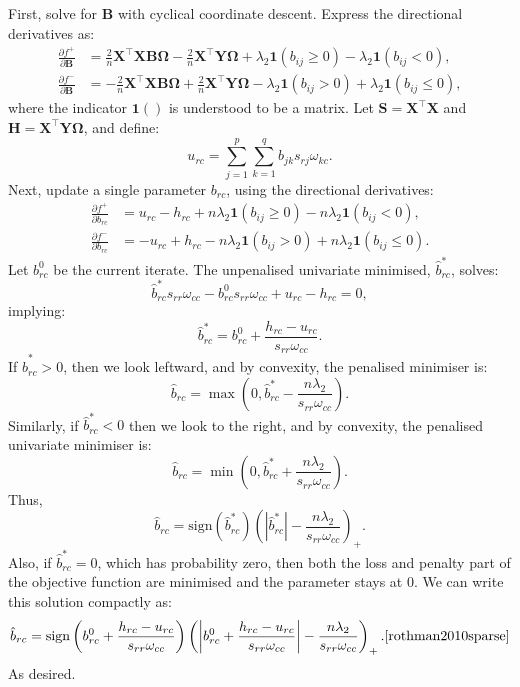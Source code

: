\documentclass[11pt]{report} %
\begin{document}
\noindent First, solve for $\mathbf{B}$ with cyclical coordinate descent. Express the directional derivatives as:
\begin{align*}
\frac{\partial f^+}{\partial \mathbf{B}} &= \frac{2}{n} \mathbf{X}^\top \mathbf{X} \mathbf{B} \mathbf{\Omega} - \frac{2}{n} \mathbf{X}^\top \mathbf{Y} \mathbf{\Omega} + \lambda_2 \mathbf{1}(b_{ij} \geq 0) - \lambda_2 \mathbf{1}(b_{ij} < 0), \\
\frac{\partial f^-}{\partial \mathbf{B}} &= -\frac{2}{n} \mathbf{X}^\top \mathbf{X} \mathbf{B} \mathbf{\Omega} + \frac{2}{n} \mathbf{X}^\top \mathbf{Y} \mathbf{\Omega} - \lambda_2 \mathbf{1}(b_{ij} > 0) + \lambda_2 \mathbf{1}(b_{ij} \leq 0),
\end{align*}
where the indicator $\mathbf{1}()$ is understood to be a matrix. Let $\mathbf{S} = \mathbf{X}^\top \mathbf{X}$ and $\mathbf{H} = \mathbf{X}^\top \mathbf{Y} \mathbf{\Omega}$, and define:
\[
u_{rc} = \sum_{j=1}^{p} \sum_{k=1}^{q} b_{jk} s_{rj} \omega_{kc}.
\]
Next, update a single parameter $b_{rc}$, using the directional derivatives:
\begin{align*}
\frac{\partial f^+}{\partial b_{rc}} &= u_{rc} - h_{rc} + n \lambda_2 \mathbf{1}(b_{ij} \geq 0) - n \lambda_2 \mathbf{1}(b_{ij} < 0), \\
\frac{\partial f^-}{\partial b_{rc}} &= -u_{rc} + h_{rc} - n \lambda_2 \mathbf{1}(b_{ij} > 0) + n \lambda_2 \mathbf{1}(b_{ij} \leq 0).
\end{align*}
\noindent Let $b_{rc}^0$ be the current iterate. The unpenalised univariate minimised, $\hat{b}^*_{rc}$, solves:
\[
\hat{b}^*_{rc} s_{rr} \omega_{cc} - b_{rc}^0 s_{rr} \omega_{cc} + u_{rc} - h_{rc} = 0,
\]
implying:
\[
\hat{b}^*_{rc} = b_{rc}^0 + \frac{h_{rc} - u_{rc}}{s_{rr} \omega_{cc}}.
\]
If $\hat{b}^*_{rc} > 0$, then we look leftward, and by convexity, the penalised minimiser is:
\[
\hat{b}_{rc} = \max\left(0, \hat{b}^*_{rc} - \frac{n \lambda_2}{s_{rr} \omega_{cc}}\right).
\]
Similarly, if $\hat{b}^*_{rc} < 0$ then we look to the right, and by convexity, the penalised univariate minimiser is:
\[
\hat{b}_{rc} = \min\left(0, \hat{b}^*_{rc} + \frac{n \lambda_2}{s_{rr} \omega_{cc}}\right).
\]
Thus,
\[
\hat{b}_{rc} = \text{sign}(\hat{b}^*_{rc})\left( |\hat{b}^*_{rc}| - \frac{n \lambda_2}{s_{rr} \omega_{cc}} \right)_+.
\]
Also, if $\hat{b}^*_{rc} = 0$, which has probability zero, then both the loss and penalty part of the objective function are minimised and the parameter stays at 0. We can write this solution compactly as:
\[
\hat{b}_{rc} = \text{sign}\left( b_{rc}^0 + \frac{h_{rc} - u_{rc}}{s_{rr} \omega_{cc}} \right) \left( \left| b_{rc}^0 + \frac{h_{rc} - u_{rc}}{s_{rr} \omega_{cc}} \right| - \frac{n \lambda_2}{s_{rr} \omega_{cc}} \right)_+.\cite{rothman2010sparse}
\]
As desired.
\end{document}
